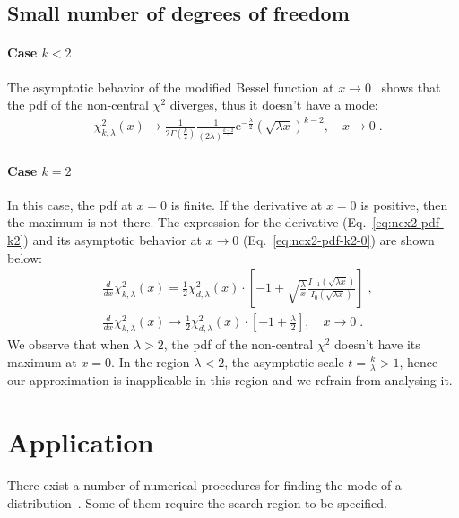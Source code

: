 \documentclass{amsart}
\numberwithin{equation}{section}
\begin{document}
\subsection{Small number of degrees of freedom}\label{subsec:edge-cases}
%
\paragraph{Case $k < 2$}
The asymptotic behavior of the modified Bessel function at $x \rightarrow 0$~\cite[Eq.~10.30.1]{NIST:DLMF} shows that the pdf of the non-central $\chi^2$ diverges, thus it doesn't have a mode:
%
\begin{align}
 &\chi^2_{k, \lambda}(x) \rightarrow \frac{1}{2\Gamma(\frac{k}{2})} \frac{1}{(2 \lambda)^{\frac{k - 2}{2}}} \mathrm{e}^{-\frac{\lambda}{2}} \left(\sqrt{\lambda x}\right)^{k-2}, \quad x \rightarrow 0\;.
\end{align}
%
\paragraph{Case $k = 2$}
In this case, the pdf at $x=0$ is finite. If the derivative at $x=0$ is positive, then the maximum is not there. The expression for the derivative (Eq.~\ref{eq:ncx2-pdf-k2}) and its asymptotic behavior at $x \rightarrow 0$ (Eq.~\ref{eq:ncx2-pdf-k2-0}) are shown below:
%
\begin{align}
 &\frac{d}{dx} \chi^2_{k, \lambda}(x) = \frac{1}{2} \chi^2_{d, \lambda}(x) \cdot \left[ -1 +  \sqrt{\frac{\lambda}{x}}\frac{I_{-1}(\sqrt{\lambda x})}{I_{0}(\sqrt{\lambda x})} \right]\label{eq:ncx2-pdf-k2}\;, \\
 &\frac{d}{dx} \chi^2_{k, \lambda}(x) \rightarrow \frac{1}{2} \chi^2_{d, \lambda}(x) \cdot \left[ -1 + \frac{\lambda}{2} \right], \quad x \rightarrow 0\label{eq:ncx2-pdf-k2-0}\;.
\end{align}
%
We observe that when $\lambda > 2$, the pdf of the non-central $\chi^2$ doesn't have its maximum at $x = 0$. In the region $\lambda < 2$, the asymptotic scale $t = \frac{k}{\lambda} > 1$, hence our approximation is inapplicable in this region and we refrain from analysing it.

\section{Application}
There exist a number of numerical procedures for finding the mode of a distribution~\cite[Ch.~10]{NR}. Some of them require the search region to be specified.
\end{document}
